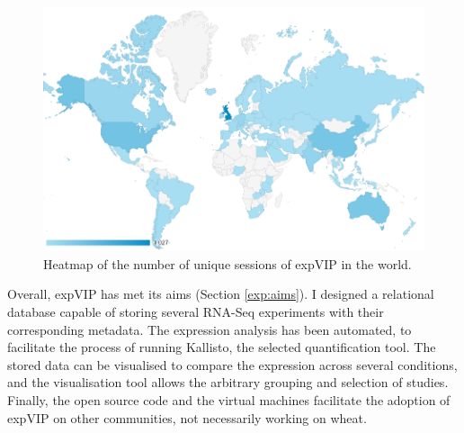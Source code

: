 \begin{figure}
\includegraphics[width=1\textwidth]{expVIP/Figures/WorldSessions.png}
\caption{Heatmap of the number of unique sessions of expVIP in the world.}
\label{fig:exp:users}
\end{figure}

Overall, expVIP has met its aims (Section \ref{exp:aims}). 
I designed a relational database capable of storing several RNA-Seq experiments with their corresponding metadata. 
The expression analysis has been automated, to facilitate the process of running Kallisto, the selected quantification tool. 
The stored data can be visualised to compare the expression across several conditions, and the visualisation tool allows the arbitrary grouping and selection of studies. 
Finally, the open source code and the virtual machines facilitate the adoption of expVIP on other communities, not necessarily working on wheat. 
